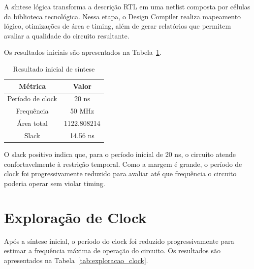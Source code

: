 \documentclass[11pt,a4paper]{article}
\begin{document}
A síntese lógica transforma a descrição RTL em uma netlist composta por células da biblioteca tecnológica. Nessa etapa, o Design Compiler realiza mapeamento lógico, otimizações de área e timing, além de gerar relatórios que permitem avaliar a qualidade do circuito resultante.

Os resultados iniciais são apresentados na Tabela~\ref{tab:sintese_inicial}.

\begin{table}[H]
\centering
\caption{Resultado inicial de síntese}
\label{tab:sintese_inicial}
\begin{tabular}{cc}
\toprule
\textbf{Métrica} & \textbf{Valor} \\
\midrule
Período de clock & 20 ns \\
Frequência & 50 MHz \\
Área total & 1122.808214 \\
Slack & 14.56 ns \\
\bottomrule
\end{tabular}
\end{table}

O slack positivo indica que, para o período inicial de 20 ns, o circuito atende confortavelmente à restrição temporal. Como a margem é grande, o período de clock foi progressivamente reduzido para avaliar até que frequência o circuito poderia operar sem violar timing.

\section{Exploração de Clock}

Após a síntese inicial, o período do clock foi reduzido progressivamente para estimar a frequência máxima de operação do circuito. Os resultados são apresentados na Tabela~\ref{tab:exploracao_clock}.
\end{document}

